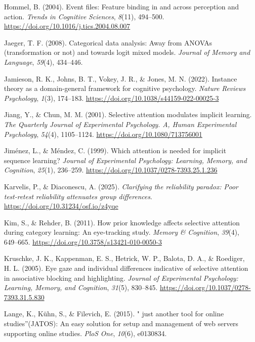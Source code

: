 \documentclass[
  man,
  floatsintext,
  longtable,
  nolmodern,
  notxfonts,
  notimes,
  mask,
  colorlinks=true,linkcolor=blue,citecolor=blue,urlcolor=blue]{apa7}
\newlength{\cslhangindent}
\newenvironment{CSLReferences}[2] %
 {\begin{list}{}{%
  \setlength{\itemindent}{0pt}
  \setlength{\leftmargin}{0pt}
  \setlength{\parsep}{0pt}
  \ifodd #1
   \setlength{\leftmargin}{\cslhangindent}
   \setlength{\itemindent}{-1\cslhangindent}
  \fi
  \setlength{\itemsep}{#2\baselineskip}}}
 {\end{list}}
\begin{document}
\begin{CSLReferences}{1}{0}
Hommel, B. (2004). Event files: Feature binding in and across perception
and action. \emph{Trends in Cognitive Sciences}, \emph{8}(11), 494--500.
\url{https://doi.org/10.1016/j.tics.2004.08.007}

Jaeger, T. F. (2008). Categorical data analysis: Away from ANOVAs
(transformation or not) and towards logit mixed models. \emph{Journal of
Memory and Language}, \emph{59}(4), 434--446.

Jamieson, R. K., Johns, B. T., Vokey, J. R., \& Jones, M. N. (2022).
Instance theory as a domain-general framework for cognitive psychology.
\emph{Nature Reviews Psychology}, \emph{1}(3), 174--183.
\url{https://doi.org/10.1038/s44159-022-00025-3}

Jiang, Y., \& Chun, M. M. (2001). Selective attention modulates implicit
learning. \emph{The Quarterly Journal of Experimental Psychology. A,
Human Experimental Psychology}, \emph{54}(4), 1105--1124.
\url{https://doi.org/10.1080/713756001}

Jiménez, L., \& Méndez, C. (1999). Which attention is needed for
implicit sequence learning? \emph{Journal of Experimental Psychology:
Learning, Memory, and Cognition}, \emph{25}(1), 236--259.
\url{https://doi.org/10.1037/0278-7393.25.1.236}

Karvelis, P., \& Diaconescu, A. (2025). \emph{Clarifying the reliability
paradox: Poor test-retest reliability attenuates group differences}.
\url{https://doi.org/10.31234/osf.io/z4yqe}

Kim, S., \& Rehder, B. (2011). How prior knowledge affects selective
attention during category learning: An eye-tracking study. \emph{Memory
\& Cognition}, \emph{39}(4), 649--665.
\url{https://doi.org/10.3758/s13421-010-0050-3}

Kruschke, J. K., Kappenman, E. S., Hetrick, W. P., Balota, D. A., \&
Roediger, H. L. (2005). Eye gaze and individual differences indicative
of selective attention in associative blocking and highlighting.
\emph{Journal of Experimental Psychology: Learning, Memory, and
Cognition}, \emph{31}(5), 830--845.
\url{https://doi.org/10.1037/0278-7393.31.5.830}

Lange, K., Kühn, S., \& Filevich, E. (2015). {"} just another tool for
online studies{''}(JATOS): An easy solution for setup and management of
web servers supporting online studies. \emph{PloS One}, \emph{10}(6),
e0130834.


\end{CSLReferences}
\end{document}

